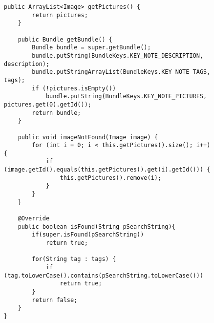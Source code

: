\begin{figure}[H]
\begin{lstlisting}[caption=Note (Joscha Nassenstein)]
    public ArrayList<Image> getPictures() {
        return pictures;
    }

    public Bundle getBundle() {
        Bundle bundle = super.getBundle();
        bundle.putString(BundleKeys.KEY_NOTE_DESCRIPTION, description);
        bundle.putStringArrayList(BundleKeys.KEY_NOTE_TAGS, tags);
        if (!pictures.isEmpty())
            bundle.putString(BundleKeys.KEY_NOTE_PICTURES, pictures.get(0).getId());
        return bundle;
    }

    public void imageNotFound(Image image) {
        for (int i = 0; i < this.getPictures().size(); i++) {
            if (image.getId().equals(this.getPictures().get(i).getId())) {
                this.getPictures().remove(i);
            }
        }
    }

    @Override
    public boolean isFound(String pSearchString){
        if(super.isFound(pSearchString))
            return true;

        for(String tag : tags) {
            if (tag.toLowerCase().contains(pSearchString.toLowerCase()))
                return true;
        }
        return false;
    }
}
\end{lstlisting}
\end{figure}

